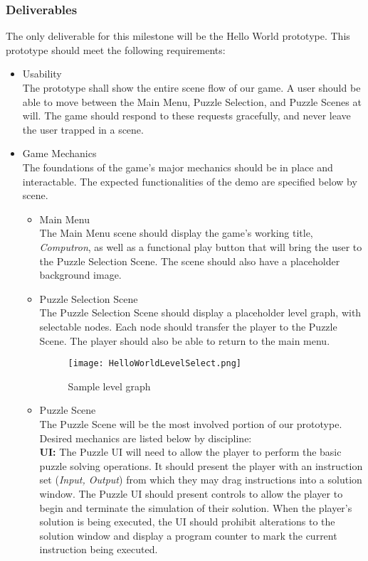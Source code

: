 \subsubsection*{Deliverables}
The only deliverable for this milestone will be the Hello World prototype. This prototype 
should meet the following requirements:
\newpage
\begin{itemize}
	\item Usability\\
	The prototype shall show the entire scene flow of our game. A user should be 
	able to move between the Main Menu, Puzzle Selection, and Puzzle Scenes at will. 
	The game should respond to these requests gracefully, and never leave the user 
	trapped in a scene. 
	\item Game Mechanics\\
	The foundations of the game's major mechanics should be in place and interactable. 
	The expected functionalities of the demo are specified below by scene.
	\begin{itemize}
		\item Main Menu\\
		The Main Menu scene should display the game's working title, \textit{Computron}, 
		as well as a functional play button that will bring the user to the Puzzle Selection 
		Scene. The scene should also have a placeholder background image.
		\item Puzzle Selection Scene\\
		The Puzzle Selection Scene should display a placeholder level graph, with selectable 
		nodes. Each node should transfer the player to the Puzzle Scene. The player should 
		also be able to return to the main menu.
		\begin{figure}[!hb]
			\begin{center}
			\caption{Sample level graph}
			\label{fig:boat1}
			\texttt{[image: HelloWorldLevelSelect.png]}
			\end{center}
		\end{figure}
		\item Puzzle Scene\\
		The Puzzle Scene will be the most involved portion of our prototype. Desired 
		mechanics are listed below by discipline:\\

		\textbf{UI:} The Puzzle UI will need to allow the player to perform the basic 
		puzzle solving operations. It should present the player with an instruction 
		set (\textit{Input, Output}) from which they may drag instructions into a solution 
		window. The Puzzle UI should present controls to allow the player to begin and 
		terminate the simulation of their solution. When the player's solution is being executed, 
		the UI should prohibit alterations to the solution window and display a program 
		counter to mark the current instruction being executed.\\


\end{itemize}
\end{itemize}
